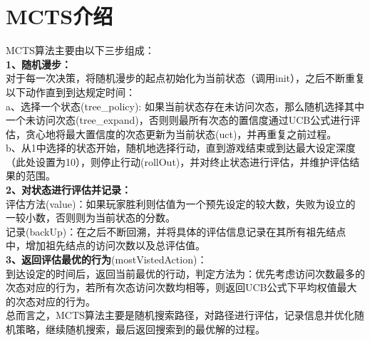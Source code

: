 \documentclass[UTF8]{article}
\begin{document}
\section{MCTS介绍}
\noindent MCTS算法主要由以下三步组成：\\
\indent\textbf{1、随机漫步：}\\
\indent 对于每一次决策，将随机漫步的起点初始化为当前状态（调用init），之后不断重复以下动作直到到达规定时间：\\
\indent a、选择一个状态(tree\_policy): 如果当前状态存在未访问次态，那么随机选择其中一个未访问次态(tree\_expand)，否则则最所有次态的置信度通过UCB公式进行评估，贪心地将最大置信度的次态更新为当前状态(uct)，并再重复之前过程。\\
\indent b、从1中选择的状态开始，随机地选择行动，直到游戏结束或到达最大设定深度（此处设置为10），则停止行动(rollOut)，并对终止状态进行评估，并维护评估结果的范围。\\
\indent\textbf{2、对状态进行评估并记录：}\\
\indent 评估方法(value)：如果玩家胜利则估值为一个预先设定的较大数，失败为设立的一较小数，否则则为当前状态的分数。\\
\indent 记录(backUp)：在之后不断回溯，并将具体的评估信息记录在其所有祖先结点中，增加祖先结点的访问次数以及总评估值。\\
\indent\textbf{3、返回评估最优的行为}(mostVistedAction)：\\
\indent 到达设定的时间后，返回当前最优的行动，判定方法为：优先考虑访问次数最多的次态对应的行为，若所有次态访问次数均相等，则返回UCB公式下平均权值最大的次态对应的行为。\\
\noindent 总而言之，MCTS算法主要是随机搜索路径，对路径进行评估，记录信息并优化随机策略，继续随机搜索，最后返回搜索到的最优解的过程。\\
\end{document}
